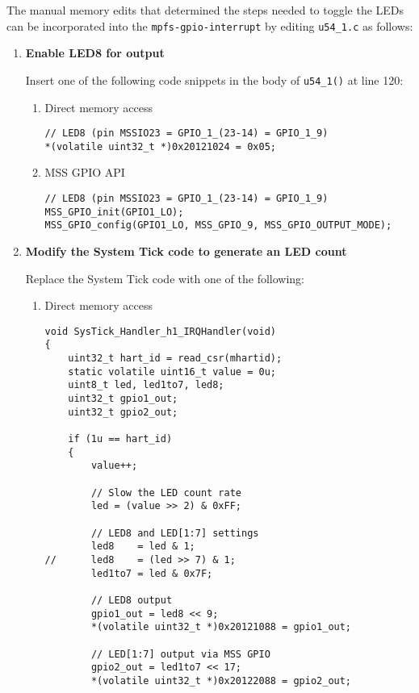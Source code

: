 The manual memory edits that determined the steps needed to toggle the LEDs
can be incorporated into the \texttt{mpfs-gpio-interrupt} by editing
\verb+u54_1.c+ as follows:
%
\begin{enumerate}
\item \textbf{Enable LED8 for output}

Insert one of the following code snippets
in the body of \verb+u54_1()+ at line 120:

\begin{enumerate}
\item Direct memory access
\begin{lstlisting}[style=c]
// LED8 (pin MSSIO23 = GPIO_1_(23-14) = GPIO_1_9)
*(volatile uint32_t *)0x20121024 = 0x05;
\end{lstlisting}
%
\item MSS GPIO API
\begin{lstlisting}[style=c]
// LED8 (pin MSSIO23 = GPIO_1_(23-14) = GPIO_1_9)
MSS_GPIO_init(GPIO1_LO);
MSS_GPIO_config(GPIO1_LO, MSS_GPIO_9, MSS_GPIO_OUTPUT_MODE);
\end{lstlisting}
\end{enumerate}

\item \textbf{Modify the System Tick code to generate an LED count}

Replace the System Tick code with one of the following:

\begin{enumerate}
\item Direct memory access
\begin{lstlisting}[style=c]
void SysTick_Handler_h1_IRQHandler(void)
{
    uint32_t hart_id = read_csr(mhartid);
    static volatile uint16_t value = 0u;
    uint8_t led, led1to7, led8;
    uint32_t gpio1_out;
    uint32_t gpio2_out;

    if (1u == hart_id)
    {
        value++;

        // Slow the LED count rate
        led = (value >> 2) & 0xFF;

        // LED8 and LED[1:7] settings
        led8    = led & 1;
//      led8    = (led >> 7) & 1;
        led1to7 = led & 0x7F;

        // LED8 output
        gpio1_out = led8 << 9;
        *(volatile uint32_t *)0x20121088 = gpio1_out;

        // LED[1:7] output via MSS GPIO
        gpio2_out = led1to7 << 17;
        *(volatile uint32_t *)0x20122088 = gpio2_out;


\end{lstlisting}
\end{enumerate}
\end{enumerate}
